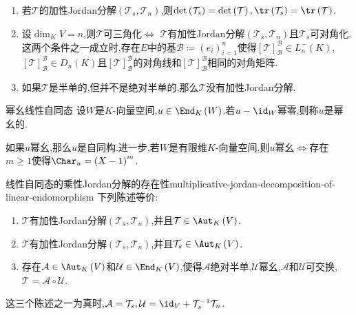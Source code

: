 \begin{remark}{}{}
	\begin{enumerate}
		\item 若$\mathcal{T}$的加性Jordan分解$\left(\mathcal{T}_{s},\mathcal{T}_{n}\right)$,则$\det\left(\mathcal{T}_{s}\right)=\det\left(\mathcal{T}\right),\tr\left(\mathcal{T}_{s}\right)=\tr\left(\mathcal{T}\right)$.
		\item 设$\dim_{K}V=n$,则$\mathcal{T}$可三角化$\iff$ $\mathcal{T}$有加性Jordan分解$\left(\mathcal{T}_{s},\mathcal{T}_{n}\right)$且$\mathcal{T}_{s}$可对角化.这两个条件之一成立时,存在$E$中的基$\mathcal{B}\coloneq\left(e_{i}\right)_{i=1}^{n}$使得$\left[\mathcal{T}\right]_{\mathcal{B}}^{\mathcal{B}}\in L_{n}^{-}\left(K\right)$,$\left[\mathcal{T}\right]_{\mathcal{B}}^{\mathcal{B}}\in D_{n}\left(K\right)$且$\left[\mathcal{T}\right]_{\mathcal{B}}^{\mathcal{B}}$的对角线和$\left[\mathcal{T}\right]_{\mathcal{B}}^{\mathcal{B}}$相同的对角矩阵.
		\item 如果$\mathcal{T}$是半单的,但并不是绝对半单的,那么$\mathcal{T}$没有加性Jordan分解.
	\end{enumerate}
\end{remark}

\begin{definition}{幂幺线性自同态}{}
	设$W$是$K$-向量空间,$u\in\End_{K}\left(W\right)$.若$u-\id_{W}$幂零,则称$u$是幂幺的.
\end{definition}

\begin{remark}{}{}
	如果$u$幂幺,那么$u$是自同构.进一步,若$W$是有限维$K$-向量空间,则$u$幂幺$\iff$存在$m\geq 1$使得$\Char_{u}=\left(X-1\right)^{m}$.
\end{remark}

\begin{proposition}{线性自同态的乘性Jordan分解的存在性}{multiplicative-jordan-decomposition-of-linear-endomorphism}
	下列陈述等价:
	\begin{enumerate}
		\item $\mathcal{T}$有加性Jordan分解$\left(\mathcal{T}_{s},\mathcal{T}_{n}\right)$,并且$\mathcal{T}\in\Aut_{K}\left(V\right)$.
		\item $\mathcal{T}$有加性Jordan分解$\left(\mathcal{T}_{s},\mathcal{T}_{n}\right)$,并且$\mathcal{T}_{s}\in\Aut_{K}\left(V\right)$.
		\item 存在$\mathcal{A}\in\Aut_{K}\left(V\right)$和$\mathcal{U}\in\End_{K}\left(V\right)$,使得$\mathcal{A}$绝对半单,$\mathcal{U}$幂幺,$\mathcal{A}$和$\mathcal{U}$可交换,$\mathcal{T}=\mathcal{A}\circ\mathcal{U}$.
	\end{enumerate}
	这三个陈述之一为真时,$\mathcal{A}=\mathcal{T}_{s},\mathcal{U}=\id_{V}+\mathcal{T}_{s}^{-1}\mathcal{T}_{n}$.
\end{proposition}

